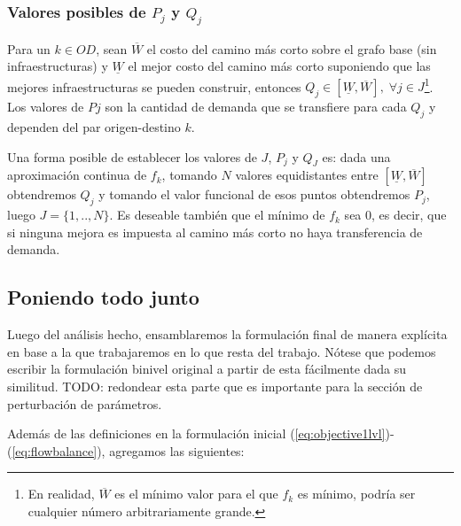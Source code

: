 \documentclass{article}
\begin{document}
  \subsubsection{Valores posibles de $P_j$ y $Q_j$}

  Para un $k \in OD$, sean $\overline{W}$ el costo del camino más corto sobre el grafo base (sin infraestructuras) y $\underline{W}$ el mejor costo del camino más corto suponiendo que las mejores infraestructuras se pueden construir, entonces $Q_j \in [\underline{W}, \overline{W}],\; \forall j \in J$\footnote{En realidad, $\overline{W}$ es el mínimo valor para el que $f_k$ es mínimo, podría ser cualquier número arbitrariamente grande.}. Los valores de $Pj$ son la cantidad de demanda que se transfiere para cada $Q_j$ y dependen del par origen-destino $k$.

  Una forma posible de establecer los valores de $J$, $P_j$ y $Q_J$ es: dada una aproximación continua de $f_k$, tomando $N$ valores equidistantes entre $[\underline{W}, \overline{W}]$ obtendremos $Q_j$ y tomando el valor funcional de esos puntos obtendremos $P_j$, luego $J=\{1,..,N\}$. Es deseable también que el mínimo de $f_k$ sea 0, es decir, que si ninguna mejora es impuesta al camino más corto no haya transferencia de demanda.

  \subsection{Poniendo todo junto}

  Luego del análisis hecho, ensamblaremos la formulación final de manera explícita en base a la que trabajaremos en lo que resta del trabajo. Nótese que podemos escribir la formulación binivel original a partir de esta fácilmente dada su similitud.
   TODO: redondear esta parte que es importante para la sección de perturbación de parámetros.

  Además de las definiciones en la formulación inicial (\ref{eq:objective1lvl})-(\ref{eq:flowbalance}), agregamos las siguientes:
\end{document}
